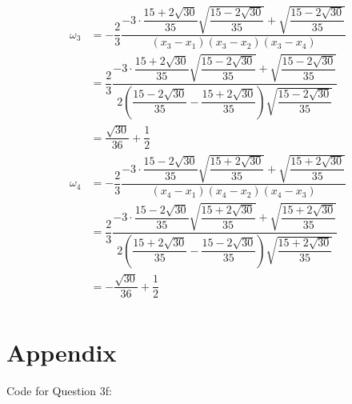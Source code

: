 \documentclass{article}
\begin{document}
\begin{enumerate}
\begin{align*}
\end{align*}
\begin{align*}
\omega_3&=-\dfrac{2}{3}\dfrac{-3\cdot \dfrac{15+2\sqrt{30}}{35}\sqrt{\dfrac{15-2\sqrt{30}}{35}}+\sqrt{\dfrac{15-2\sqrt{30}}{35}}}{(x_3-x_1)(x_3-x_2)(x_3-x_4)}\\
&=\dfrac{2}{3}\dfrac{-3\cdot \dfrac{15+2\sqrt{30}}{35}\sqrt{\dfrac{15-2\sqrt{30}}{35}}+\sqrt{\dfrac{15-2\sqrt{30}}{35}}}{2(\dfrac{15-2\sqrt{30}}{35} -\dfrac{15+ 2\sqrt{30}}{35} )\sqrt{\dfrac{15- 2\sqrt{30}}{35}}}\\
&=\dfrac{\sqrt{30}}{36}+\dfrac{1}{2}
\end{align*}
\begin{align*}
\omega_4&=-\dfrac{2}{3}\dfrac{-3\cdot \dfrac{15-2\sqrt{30}}{35}\sqrt{\dfrac{15+2\sqrt{30}}{35}}+\sqrt{\dfrac{15+2\sqrt{30}}{35}}}{(x_4-x_1)(x_4-x_2)(x_4-x_3)}\\
&=\dfrac{2}{3}\dfrac{-3\cdot \dfrac{15-2\sqrt{30}}{35}\sqrt{\dfrac{15+2\sqrt{30}}{35}}+\sqrt{\dfrac{15+2\sqrt{30}}{35}}}{2(\dfrac{15+2\sqrt{30}}{35} -\dfrac{15- 2\sqrt{30}}{35} )\sqrt{\dfrac{15+ 2\sqrt{30}}{35}}}\\
&=-\dfrac{\sqrt{30}}{36}+\dfrac{1}{2}\\
\end{align*}
 \end{enumerate}
 
 \section*{Appendix}
 
 
 Code for Question 3f:
  
  
    
    
       
\end{document}
